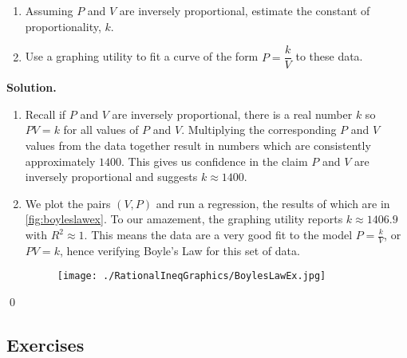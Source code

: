 \begin{ex}
\begin{table}
\caption{}
\label{tab:vp}
\end{table}

\begin{enumerate}

\item Assuming  $P$ and $V$ are inversely proportional, estimate  the constant of proportionality, $k$.

\item Use a graphing utility to fit a curve of the form $P = \dfrac{k}{V}$ to these data.  

\end{enumerate}
 
{\bf Solution.}

\begin{enumerate}

\item Recall if $P$ and $V$ are inversely proportional, there is a real number $k$ so $PV = k$ for all values of $P$ and $V$.  Multiplying the corresponding $P$ and $V$ values from the data together result in numbers which are consistently approximately $1400$.  This gives us confidence in the claim $P$ and $V$ are inversely proportional and suggests $k \approx 1400$.

\item  We plot the pairs $(V, P)$ and run a regression, the results of which are in \autoref{fig:boyleslawex}.  To our amazement, the graphing utility reports $k \approx 1406.9$ with  $R^2 \approx 1$.  This means the data are a very good fit to the model $P = \frac{k}{V}$, or $PV = k$, hence verifying Boyle's Law for this set of data.

\begin{figure}
\begin{center}

\texttt{[image: ./RationalIneqGraphics/BoylesLawEx.jpg]} 

\caption{}
\label{fig:boyleslawex}
\end{center}
\end{figure}


\end{enumerate}
\qed

\end{ex}

\clearpage

\subsection{Exercises}



\closegraphsfile